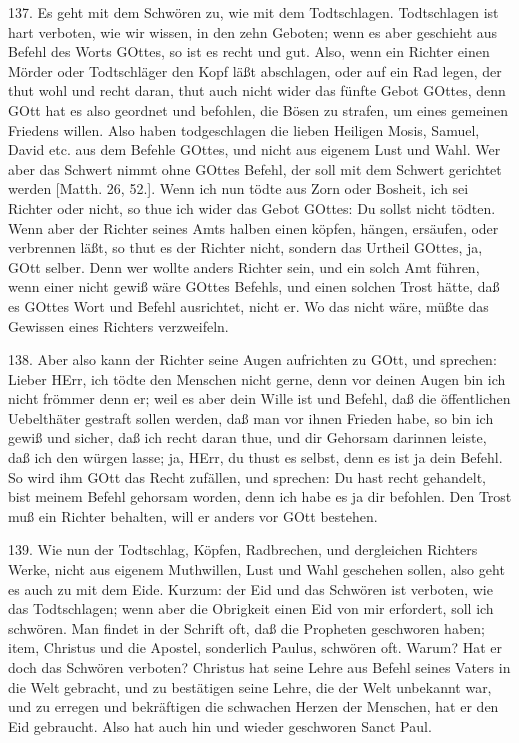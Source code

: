 137. Es geht mit dem Schwören zu, wie mit dem Todtschlagen. Todtschlagen ist hart verboten, wie wir wissen, in den zehn Geboten; wenn es aber geschieht aus Befehl des Worts GOttes, so ist es recht und gut. Also, wenn ein Richter einen Mörder oder Todtschläger den Kopf läßt abschlagen, oder auf ein Rad legen, der thut wohl und recht daran, thut auch nicht wider das fünfte Gebot GOttes, denn GOtt hat es also geordnet und befohlen, die Bösen zu strafen, um eines gemeinen Friedens willen. Also haben todgeschlagen die lieben Heiligen Mosis, Samuel, David etc. aus dem Befehle GOttes, und nicht aus eigenem Lust und Wahl. Wer aber das Schwert nimmt ohne GOttes Befehl, der soll mit dem Schwert gerichtet werden [Matth. 26, 52.]. Wenn ich nun tödte aus Zorn oder Bosheit, ich sei Richter oder nicht, so thue ich wider das Gebot GOttes: Du sollst nicht tödten. Wenn aber der Richter seines Amts halben einen köpfen, hängen, ersäufen, oder verbrennen läßt, so thut es der Richter nicht, sondern das Urtheil GOttes, ja, GOtt selber. Denn wer wollte anders Richter sein, und ein solch Amt führen, wenn einer nicht gewiß wäre GOttes Befehls, und einen solchen Trost hätte, daß es GOttes Wort und Befehl ausrichtet, nicht er. Wo das nicht wäre, müßte das Gewissen eines Richters verzweifeln.

138. Aber also kann der Richter seine Augen aufrichten zu GOtt, und sprechen: Lieber HErr, ich tödte den Menschen nicht gerne, denn vor deinen Augen bin ich nicht frömmer denn er; weil es aber dein Wille ist und Befehl, daß die öffentlichen Uebelthäter gestraft sollen werden, daß man vor ihnen Frieden habe, so bin ich gewiß und sicher, daß ich recht daran thue, und dir Gehorsam darinnen leiste, daß ich den würgen lasse; ja, HErr, du thust es selbst, denn es ist ja dein Befehl. So wird ihm GOtt das Recht zufällen, und sprechen: Du hast recht gehandelt, bist meinem Befehl gehorsam worden, denn ich habe es ja dir befohlen. Den Trost muß ein Richter behalten, will er anders vor GOtt bestehen.

139. Wie nun der Todtschlag, Köpfen, Radbrechen, und dergleichen Richters Werke, nicht aus eigenem Muthwillen, Lust und Wahl geschehen sollen, also geht es auch zu mit dem Eide. Kurzum: der Eid und das Schwören ist verboten, wie das Todtschlagen; wenn aber die Obrigkeit einen Eid von mir erfordert, soll ich schwören. Man findet in der Schrift oft, daß die Propheten geschworen haben; item, Christus und die Apostel, sonderlich Paulus, schwören oft. Warum? Hat er doch das Schwören verboten? Christus hat seine Lehre aus Befehl seines Vaters in die Welt gebracht, und zu bestätigen seine Lehre, die der Welt unbekannt war, und zu erregen und bekräftigen die schwachen Herzen der Menschen, hat er den Eid gebraucht. Also hat auch hin und wieder geschworen Sanct Paul.

